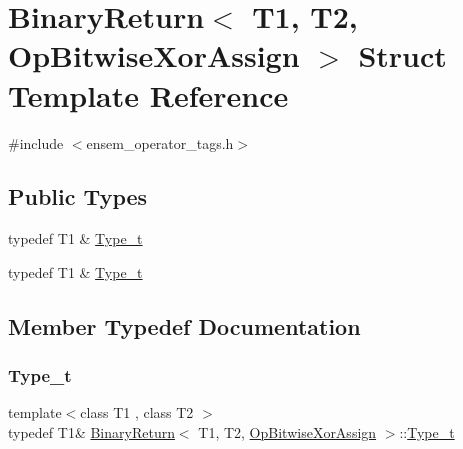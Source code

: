 \hypertarget{structBinaryReturn_3_01T1_00_01T2_00_01OpBitwiseXorAssign_01_4}{}\section{Binary\+Return$<$ T1, T2, Op\+Bitwise\+Xor\+Assign $>$ Struct Template Reference}
\label{structBinaryReturn_3_01T1_00_01T2_00_01OpBitwiseXorAssign_01_4}


{\ttfamily \#include $<$ensem\+\_\+operator\+\_\+tags.\+h$>$}

\subsection*{Public Types}
\begin{DoxyCompactItemize}
\item 
typedef T1 \& \mbox{\hyperlink{structBinaryReturn_3_01T1_00_01T2_00_01OpBitwiseXorAssign_01_4_a1f3b2b68c0947783fd491c1f8342dfc0}{Type\+\_\+t}}
\item 
typedef T1 \& \mbox{\hyperlink{structBinaryReturn_3_01T1_00_01T2_00_01OpBitwiseXorAssign_01_4_a1f3b2b68c0947783fd491c1f8342dfc0}{Type\+\_\+t}}
\end{DoxyCompactItemize}


\subsection{Member Typedef Documentation}
\mbox{\label{structBinaryReturn_3_01T1_00_01T2_00_01OpBitwiseXorAssign_01_4_a1f3b2b68c0947783fd491c1f8342dfc0}} 
\subsubsection{\texorpdfstring{Type\_t}{Type\_t}\hspace{0.1cm}{\footnotesize\ttfamily [1/2]}}
{\footnotesize\ttfamily template$<$class T1 , class T2 $>$ \\
typedef T1\& \mbox{\hyperlink{structBinaryReturn}{Binary\+Return}}$<$ T1, T2, \mbox{\hyperlink{structOpBitwiseXorAssign}{Op\+Bitwise\+Xor\+Assign}} $>$\+::\mbox{\hyperlink{structBinaryReturn_3_01T1_00_01T2_00_01OpBitwiseXorAssign_01_4_a1f3b2b68c0947783fd491c1f8342dfc0}{Type\+\_\+t}}}

